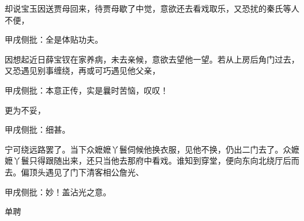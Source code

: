 \begin{parag}
    却说宝玉因送贾母回来，待贾母歇了中觉，意欲还去看戏取乐，又恐扰的秦氏等人不便，\begin{note}甲戌侧批：全是体贴功夫。\end{note}因想起近日薛宝钗在家养病，未去亲候，意欲去望他一望。若从上房后角门过去，又恐遇见别事缠绕，再或可巧遇见他父亲，\begin{note}甲戌侧批：本意正传，实是曩时苦恼，叹叹！\end{note}更为不妥，\begin{note}甲戌侧批：细甚。\end{note}宁可绕远路罢了。当下众嬷嬷丫鬟伺候他换衣服，见他不换，仍出二门去了。众嬷嬷丫鬟只得跟随出来，还只当他去那府中看戏。谁知到穿堂，便向东向北绕厅后而去。偏顶头遇见了门下清客相公詹光、\begin{note}甲戌侧批：妙！盖沾光之意。\end{note}单聘
\end{parag}
